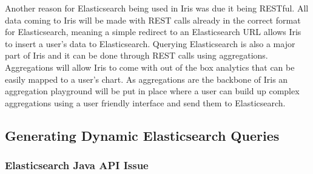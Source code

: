 \documentclass[12pt,a4paper,titlepage]{report}
\begin{document}
Another reason for Elasticsearch being used in Iris was due it being RESTful. All data coming to Iris will be made with REST calls already in the correct format for Elasticsearch, meaning a simple redirect to an Elasticsearch URL allows Iris to insert a user's data to Elasticsearch. Querying Elasticsearch is also a major part of Iris and it can be done through REST calls using aggregations. Aggregations will allow Iris to come with out of the box analytics that can be easily mapped to a user's chart. As aggregations are the backbone of Iris an aggregation playground will be put in place where a user can build up complex aggregations using a user friendly interface and send them to Elasticsearch. 

\subsection{Generating Dynamic Elasticsearch Queries}\label{sec:GDE}

\subsubsection{Elasticsearch Java API Issue}
\end{document}
